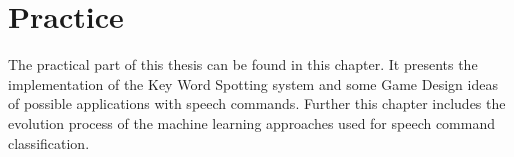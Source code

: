 \chapter{Practice}
The practical part of this thesis can be found in this chapter.
It presents the implementation of the Key Word Spotting system and some Game Design ideas of possible applications with speech commands. 
Further this chapter includes the evolution process of the machine learning approaches used for speech command classification.













